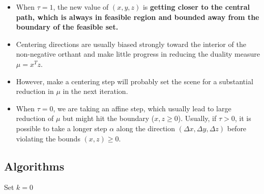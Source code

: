 \begin{refsection}
\begin{remark}\cite[398]{nocedal2006numerical}
	\begin{itemize}
			\item When $\tau = 1$, the new value of $(x,y,z)$ is \textbf{ getting closer to the  central path, which is always in feasible region and bounded away from the boundary of the feasible set.} 
		\item Centering directions are usually biased strongly toward the interior of the non-negative orthant and make little progress in reducing the duality measure $\mu = x^Tz$. 
		\item However, make a centering step will probably set the scene for a substantial reduction in $\mu$ in the next iteration.
		\item When $\tau = 0$, we are taking an affine step, which usually lead to large reduction of $\mu$ but might hit the boundary ($x,z \geq 0$). Usually, if $\tau > 0$, it is possible to take a longer step $\alpha$ along the direction $(\Delta x, \Delta y, \Delta z)$ before violating the bounds $(x,z)\geq 0$.
	\end{itemize}
\end{remark}
















\subsection{Algorithms}
\begin{algorithm}[H]
	\SetAlgoLined
	Set $k = 0$ \\
\end{algorithm}
\end{refsection}
